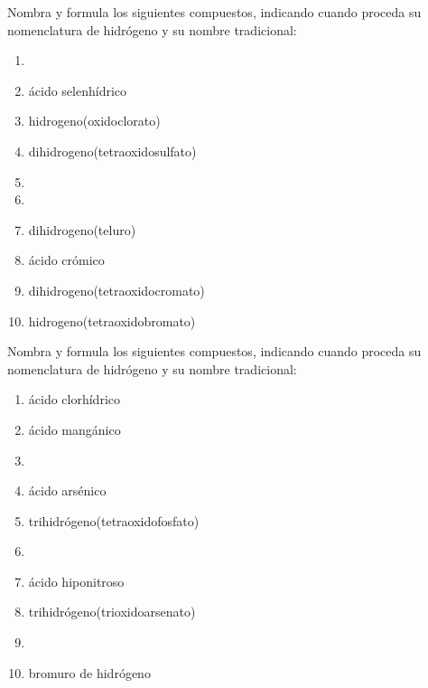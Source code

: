 \documentclass[10pt]{article}
\begin{document}
\begin{exercise}[
    tags    = {inorgánica,ácidos,ácidos binarios,ácidos ternarios},
    topics  = {química inorgánica,formulación,nomenclatura},
    source  = {SAN Formulación, p28, e34},
  ]

  Nombra y formula los siguientes compuestos, indicando cuando proceda su nomenclatura de hidrógeno y su nombre tradicional:

  \begin{enumerate}
    \item {}
    \item ácido selenhídrico
    \item hidrogeno(oxidoclorato)
    \item dihidrogeno(tetraoxidosulfato)
    \item {}
    \item {}
    \item dihidrogeno(teluro)
    \item ácido crómico
    \item dihidrogeno(tetraoxidocromato)
    \item hidrogeno(tetraoxidobromato)
  \end{enumerate}
\end{exercise}


\begin{exercise}[
  tags    = {inorgánica,ácidos,ácidos binarios,ácidos ternarios},
  topics  = {química inorgánica,formulación,nomenclatura},
  source  = {SAN Formulación, p28, e35},
  ]

  Nombra y formula los siguientes compuestos, indicando cuando proceda su nomenclatura de hidrógeno y su nombre tradicional:

  \begin{enumerate}
    \item ácido clorhídrico
    \item ácido mangánico
    \item {}
    \item ácido arsénico
    \item trihidrógeno(tetraoxidofosfato)
    \item {}
    \item ácido hiponitroso
    \item trihidrógeno(trioxidoarsenato)
    \item {}
    \item bromuro de hidrógeno
  \end{enumerate}
\end{exercise}
\end{document}
